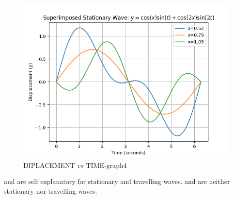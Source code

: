 \documentclass[journal,12pt,twocolumn]{IEEEtran}
\theoremstyle{remark}
\begin{document}
\begin{figure}[ht]
                            \centering
                            \includegraphics[width=\columnwidth]{ncert-physics/11.15.13/figs/d.png}
                            \caption{DIPLACEMENT $vs$ TIME-graph4}
                            \label{fig:4}
\end{figure}
 and  are self explanatory for stationary and travelling waves.
 and  are neither stationary nor travelling waves. 
\end{document}
